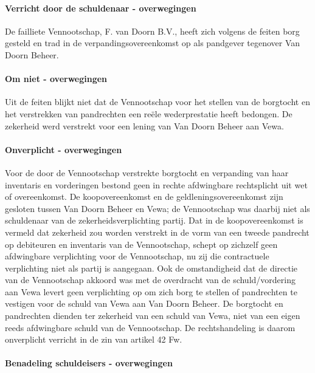 \documentclass[
  dutch,
  a4paper,
]{article}
\begin{document}
\paragraph{Verricht door de schuldenaar - overwegingen}\label{verricht-door-de-schuldenaar---overwegingen-1}

De failliete Vennootschap, F. van Doorn B.V., heeft zich volgens de feiten borg gesteld en trad in de verpandingsovereenkomst op als pandgever tegenover Van Doorn Beheer.

\paragraph{Om niet - overwegingen}\label{om-niet---overwegingen-1}

Uit de feiten blijkt niet dat de Vennootschap voor het stellen van de borgtocht en het verstrekken van pandrechten een reële wederprestatie heeft bedongen. De zekerheid werd verstrekt voor een lening van Van Doorn Beheer aan Vewa.

\paragraph{Onverplicht - overwegingen}\label{onverplicht---overwegingen-1}

Voor de door de Vennootschap verstrekte borgtocht en verpanding van haar inventaris en vorderingen bestond geen in rechte afdwingbare rechtsplicht uit wet of overeenkomst. De koopovereenkomst en de geldleningsovereenkomst zijn gesloten tussen Van Doorn Beheer en Vewa; de Vennootschap was daarbij niet als schuldenaar van de zekerheidsverplichting partij. Dat in de koopovereenkomst is vermeld dat zekerheid zou worden verstrekt in de vorm van een tweede pandrecht op debiteuren en inventaris van de Vennootschap, schept op zichzelf geen afdwingbare verplichting voor de Vennootschap, nu zij die contractuele verplichting niet als partij is aangegaan. Ook de omstandigheid dat de directie van de Vennootschap akkoord was met de overdracht van de schuld/vordering aan Vewa levert geen verplichting op om zich borg te stellen of pandrechten te vestigen voor de schuld van Vewa aan Van Doorn Beheer. De borgtocht en pandrechten dienden ter zekerheid van een schuld van Vewa, niet van een eigen reeds afdwingbare schuld van de Vennootschap. De rechtshandeling is daarom onverplicht verricht in de zin van artikel 42 Fw.

\paragraph{Benadeling schuldeisers - overwegingen}\label{benadeling-schuldeisers---overwegingen-1}
\end{document}
